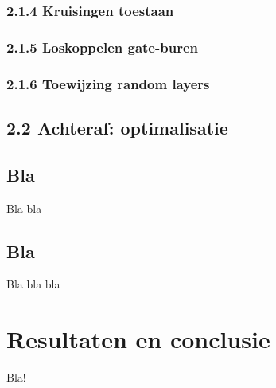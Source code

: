 \documentclass{article}
\begin{document}
	\subsubsection{2.1.4 Kruisingen toestaan}
	
	\subsubsection{2.1.5 Loskoppelen gate-buren}
	
	\subsubsection{2.1.6 Toewijzing random layers}
	
	\subsection{2.2 Achteraf: optimalisatie}
	
	
	\subsection{Bla}
	
	Bla bla
	
	\subsection{Bla}
	
	Bla bla bla
	
	\section{Resultaten en conclusie}
	
	Bla!
	
\end{document}
